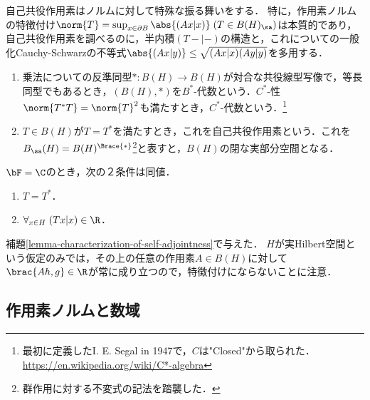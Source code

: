 \documentclass[uplatex,dvipdfmx]{jsreport}
\begin{document}
\begin{tcolorbox}[colframe=ForestGreen, colback=ForestGreen!10!white,breakable,colbacktitle=ForestGreen!40!white,coltitle=black,fonttitle=\bfseries\sffamily,
title=]
    自己共役作用素はノルムに対して特殊な振る舞いをする．
    特に，作用素ノルムの特徴付け$\norm{T}=\sup_{x\in\partial B}\abs{(Ax|x)}\;(T\in B(H)_\sa)$は本質的であり，
    自己共役作用素を調べるのに，半内積$(T-|-)$の構造と，これについての一般化Cauchy-Schwarzの不等式$\abs{(Ax|y)}\le\sqrt{(Ax|x)(Ay|y)}$を多用する．
\end{tcolorbox}

\begin{definition}\mbox{}
    \begin{enumerate}
        \item 乗法についての反準同型$*:B(H)\to B(H)$が対合な共役線型写像で，等長同型でもあるとき，$(B(H),*)$を$B^*$-代数という．$C^*$-性$\norm{T^*T}=\norm{T}^2$も満たすとき，$C^*$-代数という．\footnote{最初に定義したI. E. Segal in 1947で，$C$は"Closed"から取られた．\url{https://en.wikipedia.org/wiki/C*-algebra}}
        \item $T\in B(H)$が$T=T^*$を満たすとき，これを自己共役作用素という．これを$B_\sa(H)=B(H)^{\Brace{*}}$\footnote{群作用に対する不変式の記法を踏襲した．}と表すと，$B(H)$の閉な実部分空間となる．
    \end{enumerate}
\end{definition}


\begin{corollary}[自己共役作用素の特徴付け]\label{cor-characterization-of-self-adjointness}
    $\bF=\C$のとき，次の２条件は同値．
    \begin{enumerate}
        \item $T=T^*$．
        \item $\forall_{x\in H}\;(Tx|x)\in\R$．
    \end{enumerate}
\end{corollary}
\begin{Proof}
    補題\ref{lemma-characterization-of-self-adjointness}で与えた．
    $H$が実Hilbert空間という仮定のみでは，その上の任意の作用素$A\in B(H)$に対して$\brac{Ah,g}\in\R$が常に成り立つので，特徴付けにならないことに注意．
\end{Proof}

\subsection{作用素ノルムと数域}
\end{document}
